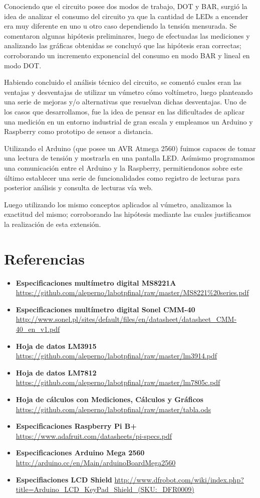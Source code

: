 \documentclass[12pt,a4paper]{article}
\begin{document}
	Conociendo que el circuito posee dos modos de trabajo, DOT y BAR, surgió la idea de analizar el consumo del circuito ya que la cantidad de LEDs a encender era muy diferente en uno u otro caso dependiendo la tensión mensurada. Se comentaron algunas hipótesis preliminares, luego de efectuadas las mediciones y analizando las gráficas obtenidas se concluyó que las hipótesis eran correctas; corroborando un incremento exponencial del consumo en modo BAR y lineal en modo DOT.

	Habiendo concluido el análisis técnico del circuito, se comentó cuales eran las ventajas y desventajas de utilizar un vúmetro cómo voltímetro, luego planteando una serie de mejoras y/o alternativas que resuelvan dichas desventajas. Uno de los casos que desarrollamos, fue la idea de pensar en las dificultades de aplicar una medición en un entorno industrial de gran escala y empleamos un Arduino y Raspberry como prototipo de sensor a distancia.

	Utilizando el Arduino (que posee un AVR Atmega 2560) fuimos capaces de tomar una lectura de tensión y mostrarla en una pantalla LED. Asímismo programamos una comunicación entre el Arduino y la Raspberry, permitiendonos sobre este último establecer una serie de funcionalidades como registro de lecturas para posterior análisis y consulta de lecturas vía web.

	Luego utilizando los mismo conceptos aplicados al vúmetro, analizamos la exactitud del mismo; corroborando las hipótesis mediante las cuales justificamos la realización de esta extensión.


	\newpage
	\section{Referencias}
		\label{sec:referencias}
		\begin{itemize}
		\item \textbf{Especificaciones multímetro digital MS8221A} \url{https://github.com/aleperno/labotpfinal/raw/master/MS8221%20series.pdf}
		\item \textbf{Especificaciones multímetro digital Sonel CMM-40} \url{http://www.sonel.pl/sites/default/files/en/datasheet/datasheet_CMM-40_en_v1.pdf}
		\item \textbf{Hoja de datos LM3915} \url{https://github.com/aleperno/labotpfinal/raw/master/lm3914.pdf}
		\item \textbf{Hoja de datos LM7812} \url{https://github.com/aleperno/labotpfinal/raw/master/lm7805c.pdf}
		\item \textbf{Hoja de cálculos con Mediciones, Cálculos y Gráficos} \url{https://github.com/aleperno/labotpfinal/raw/master/tabla.ods}
		\item \textbf{Especificaciones Raspberry Pi B+} \url{https://www.adafruit.com/datasheets/pi-specs.pdf}
		\item \textbf{Especificaciones Arduino Mega 2560} \url{http://arduino.cc/en/Main/arduinoBoardMega2560}
		\item \textbf{Especifiaciones LCD Shield} \url{http://www.dfrobot.com/wiki/index.php?title=Arduino_LCD_KeyPad_Shield_(SKU:_DFR0009)}
		\end{itemize}
\end{document}
